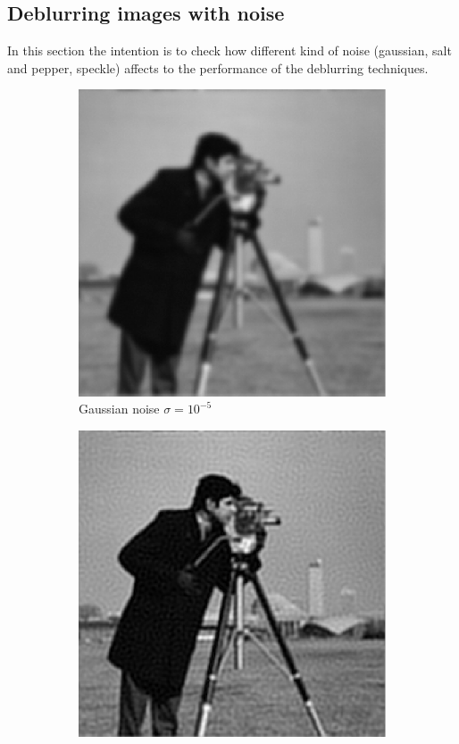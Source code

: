 \documentclass[a4paper, 10pt, conference] {article}
\begin{document}
\subsection{Deblurring images with noise}
In this section the intention is to check how different kind of noise (gaussian, salt and pepper, speckle) affects to the performance of the deblurring techniques.
\begin{figure}[H]
	\centering
	\begin{subfigure}{0.49\textwidth} 
		\centering						
		\includegraphics[scale=0.48]{gaussian/noisy/gaussian_00001.PNG}
		\caption{Gaussian noise $\sigma = 10^{-5}$}
	\end{subfigure}
	\begin{subfigure}{0.49\textwidth} 
		\centering						
		\includegraphics[scale=0.48]{gaussian/noisy/recovered_gaussian_00001_lam1000.PNG}

\end{subfigure}
\end{figure}
\end{document}
